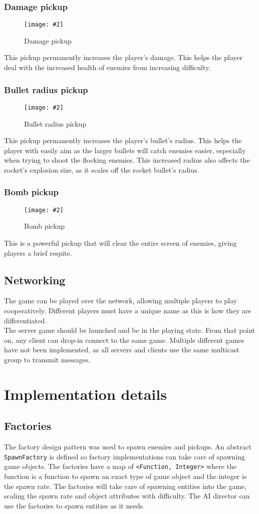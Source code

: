 \documentclass{article}
\newcommand{\n}[0]{\\[\baselineskip]}
\newcommand{\figimg}[3]{
  \begin{figure}[H]
    \centering
    \texttt{[image: \#2]}
    \caption{#3}
  \end{figure}
  \noindent 
}
\begin{document}
\subsubsection{Damage pickup}
\figimg{0.1}{imgs/DamagePickup.png}{Damage pickup}
This pickup permanently increases the player's damage. This helps the player deal with the increased health of enemies from increasing difficulty.

\subsubsection{Bullet radius pickup}
\figimg{0.1}{imgs/RadiusPickup.png}{Bullet radius pickup}
This pickup permanently increases the player's bullet's radius. This helps the player with easily aim as the larger bullets will catch enemies easier, especially when trying to shoot the flocking enemies. This increased radius also affects the rocket's explosion size, as it scales off the rocket bullet's radius.

\subsubsection{Bomb pickup}
\figimg{0.1}{imgs/BombPickup.png}{Bomb pickup}
This is a powerful pickup that will clear the entire screen of enemies, giving players a brief respite. 

\subsection{Networking}
The game can be played over the network, allowing multiple players to play cooperatively. Different players must have a unique name as this is how they are differentiated. 
\n
The server game should be launched and be in the playing state. From that point on, any client can drop-in connect to the same game. Multiple different games have not been implemented, as all servers and clients use the same multicast group to transmit messages.

\section{Implementation details}
\subsection{Factories}
The factory design pattern was used to spawn enemies and pickups. An abstract \texttt{SpawnFactory} is defined so factory implementations can take care of spawning game objects. The factories have a map of \texttt{<Function, Integer>} where the function is a function to spawn an exact type of game object and the integer is the spawn rate. The factories will take care of spawning entities into the game, scaling the spawn rate and object attributes with difficulty. The AI director can use the factories to spawn entities as it needs.
\end{document}
